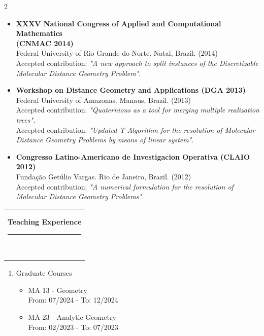 \documentclass[10pt,A4,english]{article}
\newcommand{\mpwidth}{\linewidth-\fboxsep-\fboxsep}
\newcommand{\cvtext}[1] {
	\begin{tabular*}{1\mpwidth}{p{1.05\mpwidth}}
		\parbox{1\mpwidth}{#1}
	\end{tabular*}
}
\newcommand{\cvsection}[1] {
	\vspace{14pt}
	\cvtext{
		\textbf{\LARGE{\textcolor{darkcol}{#1}}}\\[-4pt]
		\textcolor{accentcol}{ \rule{0.2\textwidth}{1.5pt} } \\
	}
}
\begin{document}
\begin{paracol}{2}
\begin{rightcolumn}
\begin{itemize}[leftmargin=*]
\bigskip

\item \textbf{XXXV National Congress of Applied and Computational Mathematics \\ (CNMAC 2014)}
\medskip \\
Federal University of Rio Grande do Norte. Natal, Brazil. (2014)
\medskip \\
Accepted contribution: \textit{"A new approach to split instances of the Discretizable Molecular Distance Geometry Problem"}.

\bigskip

\item \textbf{Workshop on Distance Geometry and Applications (DGA 2013)}
\medskip \\
Federal University of Amazonas. Manaus, Brazil. (2013)
\medskip \\
Accepted contribution: \textit{"Quaternions as a tool for merging multiple realization trees".}
\medskip \\
Accepted contribution: \textit{"Updated T Algorithm for the resolution of Molecular Distance Geometry Problems by means of linear system".}

\bigskip

\item \textbf{Congresso Latino-Americano de Investigacion Operativa (CLAIO 2012)}
\medskip \\
Fundação Getúlio Vargas. Rio de Janeiro, Brazil. (2012)
\medskip \\
Accepted contribution: \textit{"A numerical formulation for the resolution of Molecular Distance Geometry Problems".}

\end{itemize}




\cvsection{Teaching Experience}

\begin{enumerate}
    \item Graduate Courses
    \begin{itemize}

        \item MA 13 - Geometry 
        \smallskip \\ From: 07/2024 - To: 12/2024
        
        \item MA 23 - Analytic Geometry
        \smallskip \\ From: 02/2023 - To: 07/2023
        

\end{itemize}
\end{enumerate}
\end{rightcolumn}
\end{paracol}
\end{document}
